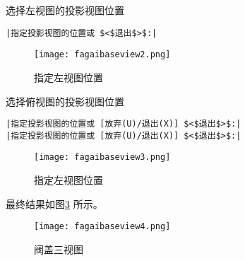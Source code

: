 \begin{procedure}
选择左视图的投影视图位置
\begin{lstlisting}
|指定投影视图的位置或 $<$退出$>$:|
\end{lstlisting}
\begin{figure}[htbp]
\centering
\texttt{[image: fagaibaseview2.png]}
\caption{指定左视图位置}\label{fig:fagaibaseview2}
\end{figure}
选择俯视图的投影视图位置
\begin{lstlisting}
|指定投影视图的位置或 [放弃(U)/退出(X)] $<$退出$>$:|
|指定投影视图的位置或 [放弃(U)/退出(X)] $<$退出$>$:|
\end{lstlisting}
\begin{figure}[htbp]
\centering
\texttt{[image: fagaibaseview3.png]}
\caption{指定左视图位置}\label{fig:fagaibaseview3}
\end{figure}
最终结果如图\ref{fig:fagaibaseview4} 所示。
\begin{figure}[htbp]
\centering
\texttt{[image: fagaibaseview4.png]}
\caption{阀盖三视图}\label{fig:fagaibaseview4}
\end{figure}
\end{procedure}
\endinput